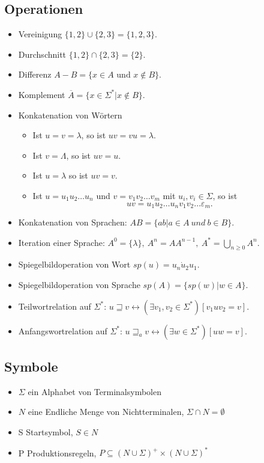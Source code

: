 \documentclass[9pt, a4paper]{article}
\begin{document}
\subsection{Operationen}
\begin{itemize}
	\item Vereinigung $\{1, 2\} \cup \{2, 3\} = \{1, 2, 3\}$.
	\item Durchschnitt $\{1, 2\} \cap \{2, 3\} = \{2\}$.
	\item Differenz $A - B = \{x \in A \text{ und } x \notin B\}$.
	\item Komplement $\overline{A} = \{x \in \Sigma^*|x\notin B\}$.
	\item Konkatenation von Wörtern
	\begin{itemize}
		\item Ist $u = v = \lambda$, so ist $uv = vu = \lambda$.
		\item Ist $v = \Lambda$, so ist $uv = u$.
		\item Ist $u = \lambda$ so ist $uv = v$.
		\item Ist $u = u_1 u_2 \dots u_n$ und $v = v_1 v_2 \dots v_m $ mit $u_i , v_i \in \Sigma$, so ist
		$$uv = u_1 u_2 \dots u_n v_1 v_2 \dots \varepsilon_m.$$
	\end{itemize}
	\item Konkatenation von Sprachen:
	$AB = \{ab|a\in A \ und\ b \in B\}.$
	\item Iteration einer Sprache:
	$A^0 = \{\lambda\},\ A^n = AA^{n-1},\ A^* = \bigcup_{n\geq 0}A^n$.
	\item Spiegelbildoperation von Wort $sp(u)=u_n \dot u_2 u_1$.
	\item Spiegelbildoperation von Sprache $sp(A)=\{sp(w)|w \in A\}$.
	\item Teilwortrelation auf $\Sigma^*$: 
	 $u \sqsupseteq v \leftrightarrow (\exists v_1, v_2 \in \Sigma^*)[v_1 u v_2 = v]$.
	 \item Anfangswortrelation auf $\Sigma^*$:
	 $ u \sqsupseteq_a v \leftrightarrow (\exists w \in \Sigma^*)[uw = v]$.
\end{itemize}
\subsection{Symbole}
\begin{itemize}
	\item $\Sigma$ ein Alphabet von Terminalsymbolen
	\item $N$ eine Endliche Menge von Nichtterminalen, $\Sigma \cap N = \emptyset$
	\item S Startsymbol, $S \in N$
	\item P Produktionsregeln, $P \subseteq (N \cup \Sigma)^+ \times (N \cup \Sigma)^*$
\end{itemize}
\end{document}
